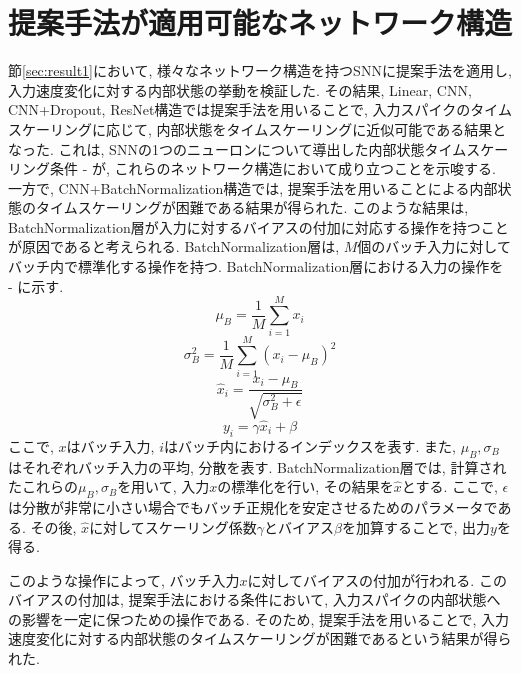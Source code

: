 \section{提案手法が適用可能なネットワーク構造}
節\ref{sec:result1}において, 様々なネットワーク構造を持つSNNに提案手法を適用し, 入力速度変化に対する内部状態の挙動を検証した.
その結果, Linear, CNN, CNN+Dropout, ResNet構造では提案手法を用いることで, 入力スパイクのタイムスケーリングに応じて, 内部状態をタイムスケーリングに近似可能である結果となった.
これは, SNNの1つのニューロンについて導出した内部状態タイムスケーリング条件 - が, これらのネットワーク構造において成り立つことを示唆する.
一方で, CNN+BatchNormalization構造では, 提案手法を用いることによる内部状態のタイムスケーリングが困難である結果が得られた.
このような結果は, BatchNormalization層が入力に対するバイアスの付加に対応する操作を持つことが原因であると考えられる.
BatchNormalization層は, $M$個のバッチ入力に対してバッチ内で標準化する操作を持つ.
BatchNormalization層における入力の操作を - に示す.
\begin{equation}
    \mu_B=\frac{1}{M}\sum_{i=1}^{M}x_i \label{eq:batchnormalization:input:mean}
\end{equation}
\begin{equation}
    \sigma_B^2=\frac{1}{M}\sum_{i=1}^{M}(x_i-\mu_B)^2 \label{eq:batchnormalization:input:variance}
\end{equation}
\begin{equation}
    \hat{x}_i=\frac{x_i-\mu_B}{\sqrt{\sigma_B^2+\epsilon}} \label{eq:batchnormalization:input:standardization}
\end{equation}
\begin{equation}
    y_i=\gamma\hat{x}_i+\beta \label{eq:batchnormalization:input:output}
\end{equation}
ここで, $x$はバッチ入力, $i$はバッチ内におけるインデックスを表す.
また, $\mu_B, \sigma_B$はそれぞれバッチ入力の平均, 分散を表す.
BatchNormalization層では, 計算されたこれらの$\mu_B, \sigma_B$を用いて, 入力$x$の標準化を行い, その結果を$\hat{x}$とする.
ここで, $\epsilon$は分散が非常に小さい場合でもバッチ正規化を安定させるためのパラメータである.
その後, $\hat{x}$に対してスケーリング係数$\gamma$とバイアス$\beta$を加算することで, 出力$y$を得る.

このような操作によって, バッチ入力$x$に対してバイアスの付加が行われる.
このバイアスの付加は, 提案手法における条件において, 入力スパイクの内部状態への影響を一定に保つための操作である.
そのため, 提案手法を用いることで, 入力速度変化に対する内部状態のタイムスケーリングが困難であるという結果が得られた.


